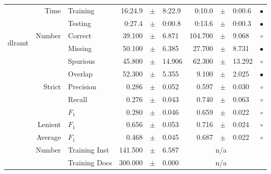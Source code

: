 \begin{longtable}{|r|r|l||rcl|rcl|c|}
\cline{2-10} & \multirow{2}{*}{      Time} &        Training &     16:24.9 &  $\pm$  &      8:22.9 &      0:10.0 &  $\pm$  &      0:00.6 & $\bullet$ \\
\cline{3-10} &                             &         Testing &      0:27.4 &  $\pm$  &      0:00.8 &      0:13.6 &  $\pm$  &      0:00.3 & $\bullet$ \\
\hline
\hline
\multirow{11}{*}{\begin{sideways}dlramt\end{sideways} }
             & \multirow{4}{*}{    Number} &         Correct &      39.100 &  $\pm$  &       6.871 &     104.700 &  $\pm$  &       9.068 & $\circ$ \\
\cline{3-10} &                             &         Missing &      50.100 &  $\pm$  &       6.385 &      27.700 &  $\pm$  &       8.731 & $\bullet$ \\
\cline{3-10} &                             &        Spurious &      45.800 &  $\pm$  &      14.906 &      62.300 &  $\pm$  &      13.292 & $\circ$ \\
\cline{3-10} &                             &         Overlap &      52.300 &  $\pm$  &       5.355 &       9.100 &  $\pm$  &       2.025 & $\bullet$ \\
\cline{2-10} & \multirow{3}{*}{    Strict} &       Precision &       0.286 &  $\pm$  &       0.052 &       0.597 &  $\pm$  &       0.030 & $\circ$ \\
\cline{3-10} &                             &          Recall &       0.276 &  $\pm$  &       0.043 &       0.740 &  $\pm$  &       0.063 & $\circ$ \\
\cline{3-10} &                             &           $F_1$ &       0.280 &  $\pm$  &       0.046 &       0.659 &  $\pm$  &       0.022 & $\circ$ \\
\cline{2-10} &                     Lenient &           $F_1$ &       0.656 &  $\pm$  &       0.053 &       0.716 &  $\pm$  &       0.024 & $\circ$ \\
\cline{2-10} &                     Average &           $F_1$ &       0.468 &  $\pm$  &       0.045 &       0.687 &  $\pm$  &       0.022 & $\circ$ \\
\cline{2-10} & \multirow{2}{*}{    Number} &   Training Inst &     141.500 &  $\pm$  &       6.587 &    \multicolumn{3}{c|}{n/a}         &  \\
\cline{3-10} &                             &   Training Docs &     300.000 &  $\pm$  &       0.000 &    \multicolumn{3}{c|}{n/a}         &  \\

\end{longtable}
